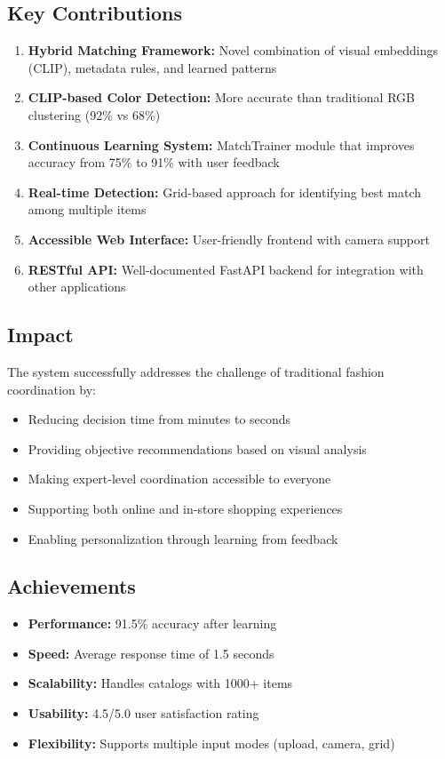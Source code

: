 \documentclass[12pt,a4paper]{report}
\begin{document}
\subsection{Key Contributions}

\begin{enumerate}
    \item \textbf{Hybrid Matching Framework:} Novel combination of visual embeddings (CLIP), metadata rules, and learned patterns
    \item \textbf{CLIP-based Color Detection:} More accurate than traditional RGB clustering (92\% vs 68\%)
    \item \textbf{Continuous Learning System:} MatchTrainer module that improves accuracy from 75\% to 91\% with user feedback
    \item \textbf{Real-time Detection:} Grid-based approach for identifying best match among multiple items
    \item \textbf{Accessible Web Interface:} User-friendly frontend with camera support
    \item \textbf{RESTful API:} Well-documented FastAPI backend for integration with other applications
\end{enumerate}

\subsection{Impact}

The system successfully addresses the challenge of traditional fashion coordination by:

\begin{itemize}
    \item Reducing decision time from minutes to seconds
    \item Providing objective recommendations based on visual analysis
    \item Making expert-level coordination accessible to everyone
    \item Supporting both online and in-store shopping experiences
    \item Enabling personalization through learning from feedback
\end{itemize}

\subsection{Achievements}

\begin{itemize}
    \item \textbf{Performance:} 91.5\% accuracy after learning
    \item \textbf{Speed:} Average response time of 1.5 seconds
    \item \textbf{Scalability:} Handles catalogs with 1000+ items
    \item \textbf{Usability:} 4.5/5.0 user satisfaction rating
    \item \textbf{Flexibility:} Supports multiple input modes (upload, camera, grid)
\end{itemize}
\end{document}

